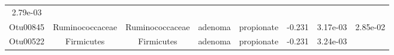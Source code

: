 \documentclass[11pt,]{article}
\begin{document}
\begin{longtable}[]{@{}cccccccc@{}}
\begin{minipage}[t]{0.08\columnwidth}
2.79e-03\strut
\end{minipage}\tabularnewline
\begin{minipage}[t]{0.08\columnwidth}\centering\strut
Otu00845\strut
\end{minipage} & \begin{minipage}[t]{0.15\columnwidth}\centering\strut
Ruminococcaceae\strut
\end{minipage} & \begin{minipage}[t]{0.15\columnwidth}\centering\strut
Ruminococcaceae\strut
\end{minipage} & \begin{minipage}[t]{0.08\columnwidth}\centering\strut
adenoma\strut
\end{minipage} & \begin{minipage}[t]{0.09\columnwidth}\centering\strut
propionate\strut
\end{minipage} & \begin{minipage}[t]{0.07\columnwidth}\centering\strut
-0.231\strut
\end{minipage} & \begin{minipage}[t]{0.08\columnwidth}\centering\strut
3.17e-03\strut
\end{minipage} & \begin{minipage}[t]{0.08\columnwidth}\centering\strut
2.85e-02\strut
\end{minipage}\tabularnewline
\begin{minipage}[t]{0.08\columnwidth}\centering\strut
Otu00522\strut
\end{minipage} & \begin{minipage}[t]{0.15\columnwidth}\centering\strut
Firmicutes\strut
\end{minipage} & \begin{minipage}[t]{0.15\columnwidth}\centering\strut
Firmicutes\strut
\end{minipage} & \begin{minipage}[t]{0.08\columnwidth}\centering\strut
adenoma\strut
\end{minipage} & \begin{minipage}[t]{0.09\columnwidth}\centering\strut
propionate\strut
\end{minipage} & \begin{minipage}[t]{0.07\columnwidth}\centering\strut
-0.231\strut
\end{minipage} & \begin{minipage}[t]{0.08\columnwidth}\centering\strut
3.24e-03\strut
\end{minipage} & \begin{minipage}[t]{0.08\columnwidth}\centering\strut

\end{minipage}
\end{longtable}
\end{document}
